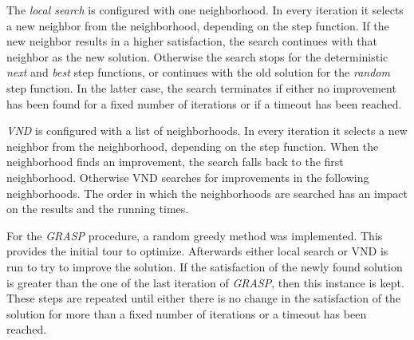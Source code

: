 \documentclass{article}
\begin{document}
\medskip

The \emph{local search} is configured with one neighborhood. In every iteration it selects a new neighbor from the neighborhood, depending on the
step function. If the new neighbor results in a higher satisfaction, the search continues with that neighbor as the new solution. Otherwise
the search stops for the deterministic \emph{next} and \emph{best} step functions, or continues with the old solution for the \emph{random}
step function. In the latter case, the search terminates if either no improvement has been found for a fixed number of iterations or if a
timeout has been reached.

\emph{VND} is configured with a list of neighborhoods. In every iteration it selects a new neighbor from the neighborhood, depending on the
step function. When the neighborhood finds an improvement, the search falls back to the first neighborhood. Otherwise VND searches for improvements in the following neighborhoods.
The order in which the neighborhoods are searched has an impact on the results and the running times.

For the \emph{GRASP} procedure, a random greedy method was implemented. This provides the initial tour to optimize. Afterwards either local
search or VND is run to try to improve the solution. If the satisfaction of the newly found solution is greater than the one of the last
iteration of \emph{GRASP}, then this instance is kept. These steps are repeated until either there is no change in the satisfaction of the
solution for more than a fixed number of iterations or a timeout has been reached.  




\end{document}
